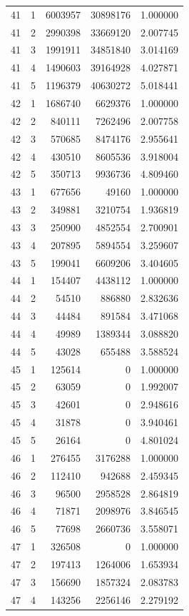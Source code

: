 \begin{longtable}{rrrrr}
41 & 1 & 6003957 & 30898176 & 1.000000 \\
41 & 2 & 2990398 & 33669120 & 2.007745 \\
41 & 3 & 1991911 & 34851840 & 3.014169 \\
41 & 4 & 1490603 & 39164928 & 4.027871 \\
41 & 5 & 1196379 & 40630272 & 5.018441 \\
42 & 1 & 1686740 & 6629376 & 1.000000 \\
42 & 2 & 840111 & 7262496 & 2.007758 \\
42 & 3 & 570685 & 8474176 & 2.955641 \\
42 & 4 & 430510 & 8605536 & 3.918004 \\
42 & 5 & 350713 & 9936736 & 4.809460 \\
43 & 1 & 677656 & 49160 & 1.000000 \\
43 & 2 & 349881 & 3210754 & 1.936819 \\
43 & 3 & 250900 & 4852554 & 2.700901 \\
43 & 4 & 207895 & 5894554 & 3.259607 \\
43 & 5 & 199041 & 6609206 & 3.404605 \\
44 & 1 & 154407 & 4438112 & 1.000000 \\
44 & 2 & 54510 & 886880 & 2.832636 \\
44 & 3 & 44484 & 891584 & 3.471068 \\
44 & 4 & 49989 & 1389344 & 3.088820 \\
44 & 5 & 43028 & 655488 & 3.588524 \\
45 & 1 & 125614 & 0 & 1.000000 \\
45 & 2 & 63059 & 0 & 1.992007 \\
45 & 3 & 42601 & 0 & 2.948616 \\
45 & 4 & 31878 & 0 & 3.940461 \\
45 & 5 & 26164 & 0 & 4.801024 \\
46 & 1 & 276455 & 3176288 & 1.000000 \\
46 & 2 & 112410 & 942688 & 2.459345 \\
46 & 3 & 96500 & 2958528 & 2.864819 \\
46 & 4 & 71871 & 2098976 & 3.846545 \\
46 & 5 & 77698 & 2660736 & 3.558071 \\
47 & 1 & 326508 & 0 & 1.000000 \\
47 & 2 & 197413 & 1264006 & 1.653934 \\
47 & 3 & 156690 & 1857324 & 2.083783 \\
47 & 4 & 143256 & 2256146 & 2.279192 \\

\end{longtable}
